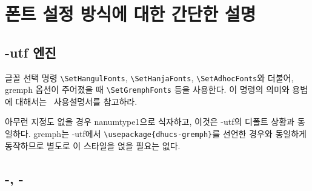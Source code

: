 \documentclass[
	12pt,
	a4paper,
	kosection,
	footnote,
	nobookmarks,
	microtype,
	figtabcapt,
]{oblivoir}
\def\myREF#1#2{\ref{#1}}
\def\myLabel#1#2{\label{#1}}
\def\myREF#1#2{\ref{#2}}
\def\myLabel#1#2{\label{#2}}
\newcommand\xobclass{x\-ob\-liv\-oir\oblivoirallowbreak}
\newcommand\obclass{ob\-liv\-oir\oblivoirallowbreak}
\begin{document}

\section{폰트 설정 방식에 대한 간단한 설명}\myLabel{sec:font}{sec:폰트}

\subsection{\koTeX-utf 엔진}

글꼴 선택 명령 \verb|\SetHangulFonts|, \verb|\SetHanjaFonts|, \verb|\SetAdhocFonts|와 더불어,
gremph 옵션이 주어졌을 때 \verb|\SetGremphFonts| 등을 사용한다.
이 명령의 의미와 용법에 대해서는 \koTeX\ 사용설명서를 참고하라.

아무런 지정도 없을 경우 nanumtype1으로 식자하고, 이것은 \koTeX-utf의 디폴트 상황과 동일하다.
gremph는 \koTeX-utf에서 \verb|\usepackage{dhucs-gremph}|를 선언한 경우와 동일하게
동작하므로 별도로 이 스타일을 얹을 필요는 없다.

\subsection{\XeTeX-\ko, \LuaTeX-\ko}
\end{document}
